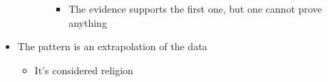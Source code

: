 \documentclass[letterpaper]{article}
\begin{document}
\begin{itemize}
\begin{itemize}
\begin{itemize}
\begin{itemize}
\item The evidence supports the first one, but one cannot prove
anything
\end{itemize}
\end{itemize}
\end{itemize}

\item The pattern is an extrapolation of the data

\begin{itemize}
\item It's considered religion
\end{itemize}
\end{itemize}
\end{document}
